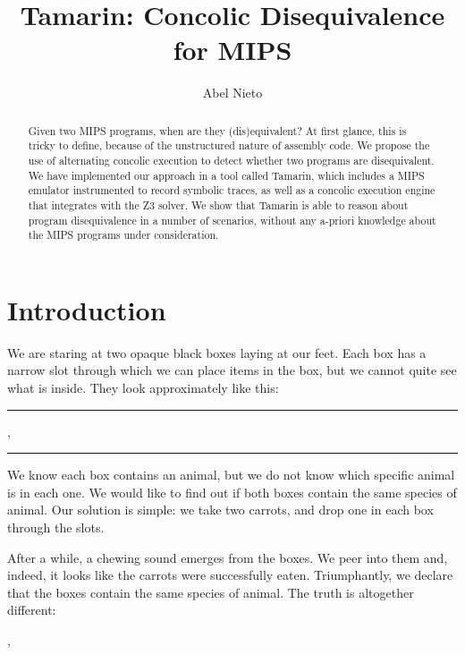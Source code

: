 \documentclass{llncs}
\title{Tamarin: Concolic Disequivalence for MIPS}
\author{Abel Nieto}
\institute{
University of Waterloo\\
\email{anietoro@uwaterloo.ca}
}
\newcommand{\crule}[3][black]{\textcolor{#1}{\rule{#2}{#3}}}
\begin{document}
\maketitle

\begin{abstract}
Given two MIPS programs, when are they (dis)equivalent? At first glance, this is tricky to define, because of the unstructured nature of assembly code. We propose the use of alternating concolic execution to detect whether two programs are disequivalent. We have implemented our approach in a tool called Tamarin, which includes a MIPS emulator instrumented to record symbolic traces, as well as a concolic execution engine that integrates with the Z3 solver. We show that Tamarin is able to reason about program disequivalence in a number of scenarios, without any a-priori knowledge about the MIPS programs under consideration.
\end{abstract}

\section{Introduction}

We are staring at two opaque black boxes laying at our feet. Each box has a narrow slot through which we can place items in the box, but we cannot quite see what is inside. They look approximately like this:

\vspace{1mm}
\crule{1.5cm}{1.5cm}, \crule{1.5cm}{1.5cm}
\vspace{1mm}

We know each box contains an animal, but we do not know which specific animal is in each one. We would like to find out if both boxes contain the same species of animal. Our solution is simple: we take two carrots, and drop one in each box through the slots.

After a while, a chewing sound emerges from the boxes. We peer into them and, indeed, it looks like the carrots were successfully eaten. Triumphantly, we declare that the boxes contain the same species of animal. The truth is altogether different:

\vspace{1mm}
, 
\vspace{1mm}
\end{document}
